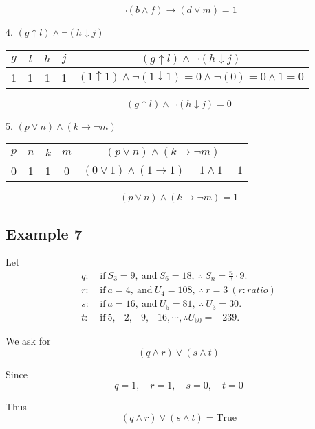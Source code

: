 \documentclass[12pt,a4paper,openany]{article}
\begin{document}
\[
\boxed{\neg(b \land f) \to (d \lor m) = 1}
\]


{4. } $(g \uparrow l) \land \neg(h \downarrow j)$

\begin{center}
\begin{tabular}{|c|c|c|c||c|}
\hline
$g$ & $l$ & $h$ & $j$ & $(g \uparrow l) \land \neg(h \downarrow j)$ \\
\hline
1 & 1 & 1 & 1 & $(1 \uparrow 1) \land \neg(1 \downarrow 1) = 0 \land \neg(0) = 0 \land 1 = 0$ \\
\hline
\end{tabular}
\end{center}

\[
\boxed{(g \uparrow l) \land \neg(h \downarrow j) = 0}
\]


{5. } $(p \lor n) \land (k \to \neg m)$

\begin{center}
\begin{tabular}{|c|c|c|c||c|}
\hline
$p$ & $n$ & $k$ & $m$ & $(p \lor n) \land (k \to \neg m)$ \\
\hline
0 & 1 & 1 & 0 & $(0 \lor 1) \land (1 \to 1) = 1 \land 1 = 1$ \\
\hline
\end{tabular}
\end{center}

\[
\boxed{(p \lor n) \land (k \to \neg m) = 1}
\]


\subsection{Example 7}\label{example-7}

Let
\[
\begin{aligned}
 q :& \ \text{if} \ S_3 = 9, \ \text{and} \ S_6 = 18, \ \therefore \ S_n = \frac{n}{3} \cdot 9.\\
 r :& \ \text{if} \ a = 4, \ \text{and} \ U_4 = 108, \ \therefore \ r= 3 \ (r:ratio)  \\ 
 s :& \ \text{if} \ a = 16, \ \text{and} \ U_5 = 81, \ \therefore \ U_3= 30.\\
 t :& \ \text{if} \ 5,-2,-9,-16, \cdots, \therefore U_{50} = -239.
\end{aligned}
\]

We ask for
\[(q \land r) \lor (s \land t)
\]

Since
\[q = 1, \quad r = 1, \quad s = 0, \quad t = 0
\]

Thus
\[\boxed{(q \land r) \lor (s \land t) =  \text{True}}
\]
\end{document}
